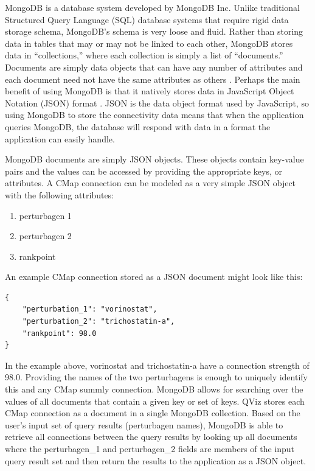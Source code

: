 \documentclass[12pt]{article}
\begin{document}
MongoDB is a database system developed by MongoDB Inc. Unlike traditional Structured Query Language (SQL) database systems that require rigid data storage schema, MongoDB's schema is very loose and fluid. Rather than storing data in tables that may or may not be linked to each other, MongoDB stores data in ``collections,'' where each collection is simply a list of ``documents.'' Documents are simply data objects that can have any number of attributes and each document need not have the same attributes as others \cite{mongodb}. Perhaps the main benefit of using MongoDB is that it natively stores data in JavaScript Object Notation (JSON) format \cite{json}. JSON is the data object format used by JavaScript, so using MongoDB to store the connectivity data means that when the application queries MongoDB, the database will respond with data in a format the application can easily handle.

MongoDB documents are simply JSON objects. These objects contain key-value pairs and the values can be accessed by providing the appropriate keys, or attributes. A CMap connection can be modeled as a very simple JSON object with the following attributes:

\begin{enumerate}
\item perturbagen 1
\item perturbagen 2
\item rankpoint
\end{enumerate}

An example CMap connection stored as a JSON document might look like this:

\begin{lstlisting}
{
	"perturbation_1": "vorinostat",
	"perturbation_2": "trichostatin-a",
	"rankpoint": 98.0
}
\end{lstlisting}
	
In the example above, vorinostat and trichostatin-a have a connection strength of 98.0. Providing the names of the two perturbagens is enough to uniquely identify this and any CMap summly connection. MongoDB allows for searching over the values of all documents that contain a given key or set of keys. QViz stores each CMap connection as a document in a single MongoDB collection. Based on the user's input set of query results (perturbagen names), MongoDB is able to retrieve all connections between the query results by looking up all documents where the perturbagen\_1 and perturbagen\_2 fields are members of the input query result set and then return the results to the application as a JSON object.
\end{document}
